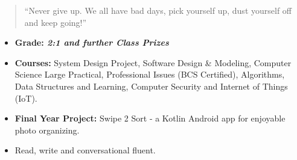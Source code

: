 \begin{quote}
``Never give up. We all have bad days, pick yourself up, dust yourself off and keep going!''
\end{quote}


\smallskip
\smallskip
\smallskip
\smallskip


\begin{itemize}
\item \textbf{Grade: \textit{2:1 and further Class Prizes}}
\item \textbf{Courses:} System Design Project, Software Design \& Modeling, Computer Science Large Practical, Professional Issues (BCS Certified), Algorithms, Data Structures and Learning, Computer Security and Internet of Things (IoT).
\item \textbf{Final Year Project:} Swipe 2 Sort - a Kotlin Android app for enjoyable photo organizing.
\end{itemize}
\divider




{}
{}
{}
{}
{}
{}
{}
{}
{}
{}
{}
\smallskip
\smallskip






\begin{itemize}
\item Read, write and conversational fluent.
\smallskip
\smallskip
\end{itemize}

